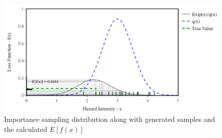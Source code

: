     \begin{figure}[H]
        \centering
        \includegraphics[scale=0.5]{Figures/Images/Illustrative Example/IS_samples.png}
        \caption{Importance sampling distribution along with generated samples and the calculated $E[f(x)]$}
        \label{fig:IS_samples}
    \end{figure}
